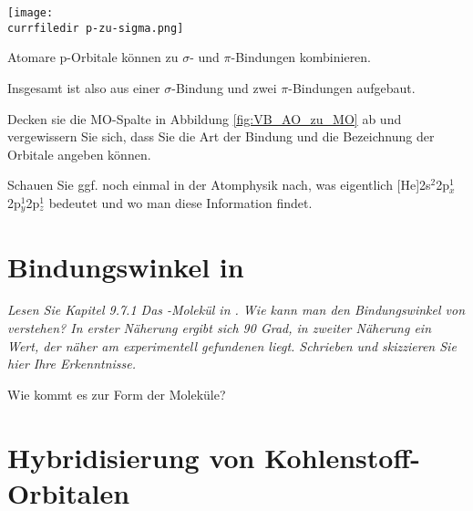 %
\begin{marginfigure}
\texttt{[image: \\currfiledir p-zu-sigma.png]}
\caption{Atomare p-Orbitale können zu $\sigma$- und $\pi$-Bindungen kombinieren. }
\end{marginfigure}
%

Insgesamt ist  also aus einer $\sigma$-Bindung und zwei $\pi$-Bindungen aufgebaut.


\begin{questions} 
\item Decken sie die MO-Spalte in Abbildung  \ref{fig:VB_AO_zu_MO} ab und vergewissern Sie sich, dass Sie die Art der Bindung und die Bezeichnung der Orbitale angeben können.

\item Schauen Sie ggf. noch einmal in der Atomphysik nach, was eigentlich [He]2s$^2$2p$_x^1$2p$_y^1$2p$_z^1$ bedeutet und wo man diese Information findet.
\end{questions}



\section{Bindungswinkel  in  }


\textit{Lesen Sie Kapitel 9.7.1 Das -Molekül in \cite{Demtröder_ep3}. Wie kann man den Bindungswinkel von  verstehen? In erster Näherung ergibt sich 90 Grad, in zweiter Näherung ein Wert, der näher am experimentell gefundenen liegt. \newline Schrieben und skizzieren Sie hier Ihre Erkenntnisse. }

\vspace*{10cm}

\begin{questions} 
\item Wie kommt es zur Form der Moleküle?
\end{questions}


\section{Hybridisierung von Kohlenstoff-Orbitalen}

